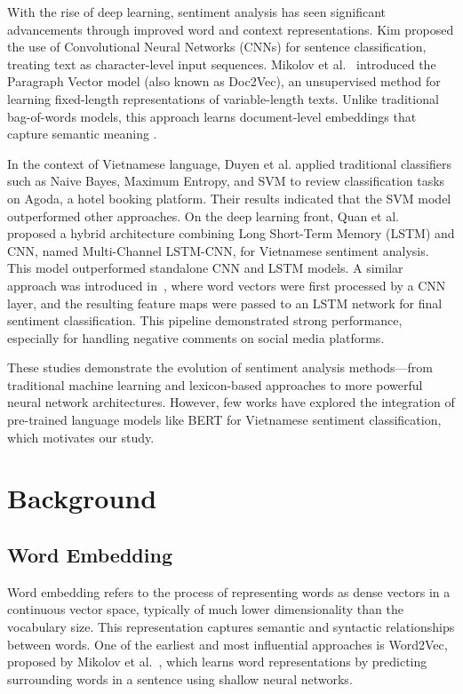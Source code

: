 \documentclass[11pt]{article}
\begin{document}
With the rise of deep learning, sentiment analysis has seen significant advancements through improved word and context representations. Kim \cite{zhang2015character} proposed the use of Convolutional Neural Networks (CNNs) for sentence classification, treating text as character-level input sequences. Mikolov et al.~\cite{mikolov2013distributed} introduced the Paragraph Vector model (also known as Doc2Vec), an unsupervised method for learning fixed-length representations of variable-length texts. Unlike traditional bag-of-words models, this approach learns document-level embeddings that capture semantic meaning \cite{mikolov2013distributedWord}.

In the context of Vietnamese language, Duyen et al. \cite{duyen} applied traditional classifiers such as Naive Bayes, Maximum Entropy, and SVM to review classification tasks on Agoda, a hotel booking platform. Their results indicated that the SVM model outperformed other approaches. On the deep learning front, Quan et al.~\cite{quan2019multi} proposed a hybrid architecture combining Long Short-Term Memory (LSTM) and CNN, named Multi-Channel LSTM-CNN, for Vietnamese sentiment analysis. This model outperformed standalone CNN and LSTM models. A similar approach was introduced in~\cite{vo2019deep}, where word vectors were first processed by a CNN layer, and the resulting feature maps were passed to an LSTM network for final sentiment classification. This pipeline demonstrated strong performance, especially for handling negative comments on social media platforms.

These studies demonstrate the evolution of sentiment analysis methods—from traditional machine learning and lexicon-based approaches to more powerful neural network architectures. However, few works have explored the integration of pre-trained language models like BERT for Vietnamese sentiment classification, which motivates our study.



\section{Background}
\label{sec:background}
\subsection{Word Embedding}

Word embedding refers to the process of representing words as dense vectors in a continuous vector space, typically of much lower dimensionality than the vocabulary size. This representation captures semantic and syntactic relationships between words. One of the earliest and most influential approaches is Word2Vec, proposed by Mikolov et al.~\cite{mikolov2013distributedWord}, which learns word representations by predicting surrounding words in a sentence using shallow neural networks.
\end{document}
